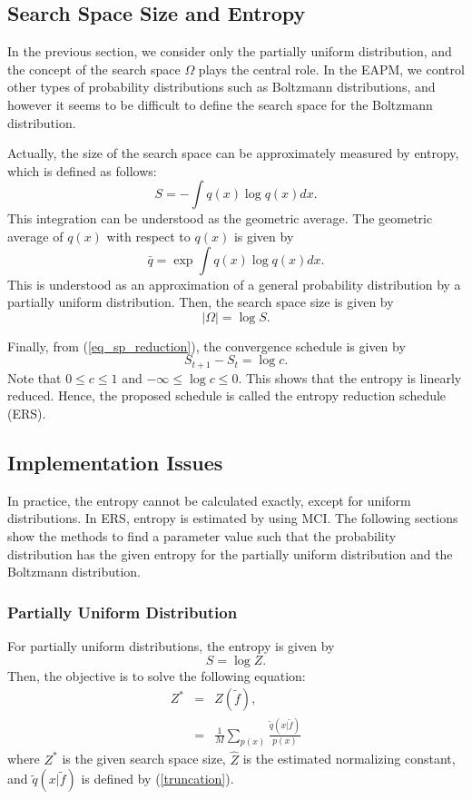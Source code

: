 \subsection{Search Space Size and Entropy}
In the previous section, 
we consider only the partially uniform distribution, 
and the concept of the search space $\Omega$ plays the central role. 
In the EAPM, we control other types of probability distributions 
such as Boltzmann distributions, and however
it seems to be difficult to define the search space for the Boltzmann
distribution.

Actually, the size of the search space can be approximately measured by 
entropy, which is defined as follows:
\begin{equation}
 S=-\int q(x) \log q(x) dx.
\end{equation}
This integration can be understood as the geometric average.
The geometric average of $q(x)$ with respect to $q(x)$ 
is given by
\begin{equation}
 \bar q = \exp \int q(x) \log q(x) dx.
\end{equation}
This is understood as
an approximation of a general probability distribution
by a partially uniform distribution.
Then, the search space size is given by
\begin{equation}
 |\Omega|= \log S.
\end{equation} 

Finally, from (\ref{eq_sp_reduction}),
the convergence schedule is given by
\begin{equation}
 S_{t+1} - S_t= \log c.
\end{equation}
Note that $0 \leq c \leq 1$ and $-\infty \leq \log c \leq 0$.
This shows that the entropy is linearly reduced.
Hence, the proposed schedule is called
the entropy reduction schedule (ERS).


\subsection{Implementation Issues}
In practice, the entropy cannot be calculated exactly,
except for uniform distributions.
In ERS, entropy is estimated by using MCI.
The following sections show the methods
to find a parameter value such that
the probability distribution has the given entropy
for the partially uniform distribution and the Boltzmann distribution.


\subsubsection{Partially Uniform Distribution}
\label{sec-ftilde}
For partially uniform distributions,
the entropy is given by
\begin{equation}
 S=\log Z.
\end{equation}
Then, the objective is to solve the following equation:
\begin{eqnarray}
 Z^*&=&\hat Z(\tilde f),\\
    &=&\frac{1}{M} \sum_{p(x)} \frac{\tilde q(x|\tilde f)}{p(x)}
\end{eqnarray}
where $Z^*$ is the given search space size,
$\hat Z$ is the estimated normalizing constant, and
$\tilde q(x|\tilde f)$ is defined by (\ref{truncation}).


